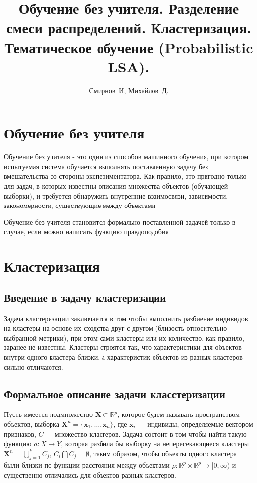 \documentclass[10pt]{article}
\title{Обучение без учителя. Разделение смеси распределений. Кластеризация. Тематическое обучение (Probabilistic LSA). }
\author{Смирнов~И, Михайлов~Д.}
\begin{document}
\maketitle
	
	
\section{Обучение без учителя}

Обучение без учителя - это один из способов машинного обучения, при котором испытуемая система обучается выполнять поставленную задачу без вмешательства со стороны экспериментатора.  Как правило, это пригодно только для задач, в которых известны описания множества объектов (обучающей выборки), и требуется обнаружить внутренние взаимосвязи, зависимости, закономерности, существующие между объектами

Обучение без учителя становится формально поставленной задачей только в случае, если можно написать функцию правдоподобия

\section{Кластеризация}

\subsection{Введение в задачу кластеризации}

Задача кластеризации заключается в том чтобы выполнить разбиение индивидов на кластеры на основе их сходства друг с другом (близость относительно выбранной метрики), при этом сами кластеры или их количество, как правило, заранее не известны. Кластеры строятся так, что характеристики для объектов внутри одного кластера близки, а характеристик объектов из разных кластеров сильно отличаются.

\subsection{Формальное описание задачи класстеризации}

Пусть имеется подмножество $\pmb X \subset \mathbb{R}^{p}$, которое будем называть
пространством объектов, выборка $\pmb X^{n} = \{\pmb x_1, \dots, \pmb x_{n}\}$, где $\pmb x_{i} $ --- индивиды, определяемые вектором признаков, $C$ --- множество кластеров. Задача состоит в том чтобы найти такую функцию $a: X \rightarrow Y$, которая разбила бы выборку на непересекающиеся кластеры $\pmb X^{n}= \bigcup_{j = 1}^{k} C_{j}, \  C_{i} \bigcap C_{j} = \emptyset$, таким образом, чтобы объекты одного кластера были близки по функции расстояния между объектами $\rho :  \mathbb{R}^{p} \times  \mathbb{R}^{p} \rightarrow [0,\infty)$ и существенно отличались для объектов разных кластеров.
\end{document}
